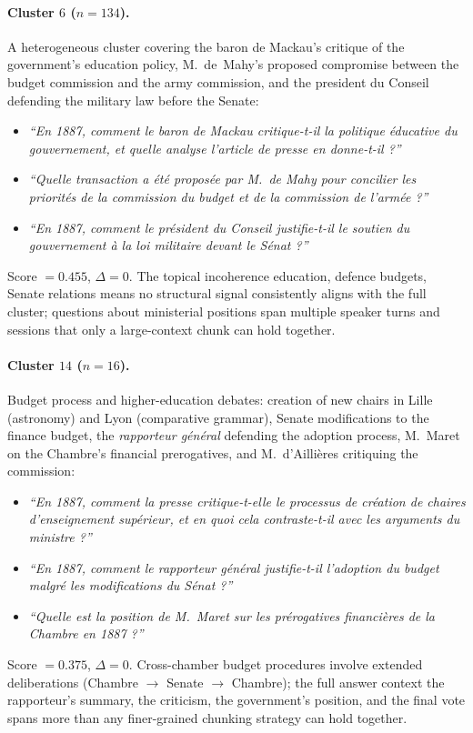 \paragraph{Cluster $6$ ($n=134$).}
A heterogeneous cluster covering the baron de Mackau's critique of the
government's education policy, M.~de~Mahy's proposed compromise between the
budget commission and the army commission, and the president du Conseil defending
the military law before the Senate:
\begin{itemize}
  \item \textit{``En 1887, comment le baron de Mackau critique-t-il la politique
    \'{e}ducative du gouvernement, et quelle analyse l'article de presse en
    donne-t-il ?''}
  \item \textit{``Quelle transaction a \'{e}t\'{e} propos\'{e}e par M.~de Mahy pour
    concilier les priorit\'{e}s de la commission du budget et de la commission de
    l'arm\'{e}e ?''}
  \item \textit{``En 1887, comment le pr\'{e}sident du Conseil justifie-t-il le
    soutien du gouvernement \`{a} la loi militaire devant le S\'{e}nat ?''}
\end{itemize}
Score $= 0.455$, $\Delta = 0$.
The topical incoherence education, defence budgets, Senate relations means
no structural signal consistently aligns with the full cluster; questions about
ministerial positions span multiple speaker turns and sessions that only a
large-context chunk can hold together.

\paragraph{Cluster $14$ ($n=16$).}
Budget process and higher-education debates: creation of new chairs in Lille
(astronomy) and Lyon (comparative grammar), Senate modifications to the finance
budget, the \emph{rapporteur g\'{e}n\'{e}ral} defending the adoption process,
M.~Maret on the Chambre's financial prerogatives, and M.~d'Ailli\`{e}res
critiquing the commission:
\begin{itemize}
  \item \textit{``En 1887, comment la presse critique-t-elle le processus de
    cr\'{e}ation de chaires d'enseignement sup\'{e}rieur, et en quoi cela
    contraste-t-il avec les arguments du ministre ?''}
  \item \textit{``En 1887, comment le rapporteur g\'{e}n\'{e}ral justifie-t-il
    l'adoption du budget malgr\'{e} les modifications du S\'{e}nat ?''}
  \item \textit{``Quelle est la position de M.~Maret sur les pr\'{e}rogatives
    financi\`{e}res de la Chambre en 1887 ?''}
\end{itemize}
Score $= 0.375$, $\Delta = 0$.
Cross-chamber budget procedures involve extended deliberations
(Chambre $\to$ Senate $\to$ Chambre); the full answer context the rapporteur's
summary, the criticism, the government's position, and the final vote spans
more than any finer-grained chunking strategy can hold together.

